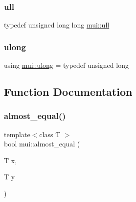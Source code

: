 \mbox{\label{namespacemui_ad0c8bc9723291f37096fd61fcb905115}} 
\subsubsection{\texorpdfstring{ull}{ull}}
{\footnotesize\ttfamily typedef unsigned long long \hyperlink{namespacemui_ad0c8bc9723291f37096fd61fcb905115}{mui\+::ull}}

\mbox{\label{namespacemui_a9547f17257ee9191f5ca66284f9ca8ab}} 
\subsubsection{\texorpdfstring{ulong}{ulong}}
{\footnotesize\ttfamily using \hyperlink{namespacemui_a9547f17257ee9191f5ca66284f9ca8ab}{mui\+::ulong} = typedef unsigned long}



\subsection{Function Documentation}
\mbox{\label{namespacemui_a2e00c62074bb5b841ee769fdaca679a0}} 
\subsubsection{\texorpdfstring{almost\+\_\+equal()}{almost\_equal()}}
{\footnotesize\ttfamily template$<$class T $>$ \\
bool mui\+::almost\+\_\+equal (\begin{DoxyParamCaption}\item[{T}]{x,  }\item[{T}]{y }\end{DoxyParamCaption})\hspace{0.3cm}{\ttfamily [inline]}}

\mbox{\label{namespacemui_af94c98a0248d6923c8681b4d2c39df6e}} 
